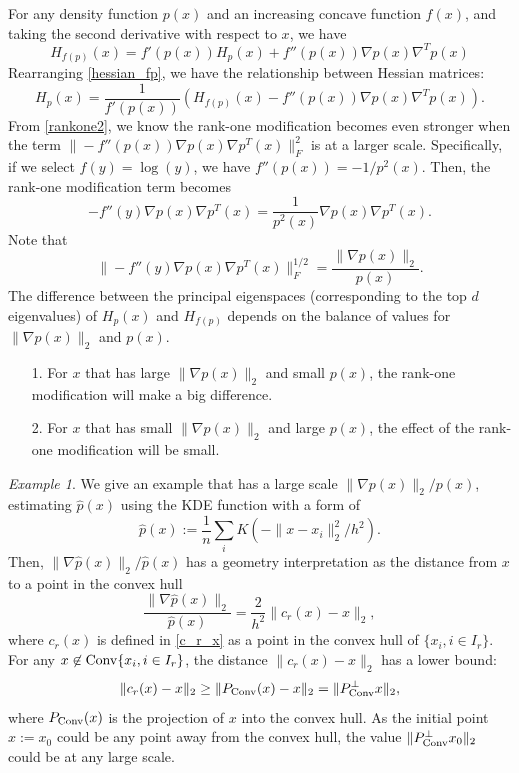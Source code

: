 \documentclass[aos,preprint]{imsart}
\theoremstyle{remark}
\newtheorem*{example}{Example}
\begin{document}
For any density function $p(x)$ and an increasing concave function $f(x)$, and taking the second derivative with respect to $x$, we have
\begin{equation}\label{hessian_fp}
H_{f(p)}(x) = f'(p(x)) H_p(x) +f''(p(x)) \nabla p(x)\nabla^T p(x)
\end{equation}
Rearranging \eqref{hessian_fp}, we have the relationship between Hessian matrices:
\begin{equation}\label{rankone2}
 H_{p}(x) =\frac{1}{ f'(p(x))} (H_{f(p)}(x) - f''(p(x))\nabla p(x) \nabla^T p(x)) .
\end{equation}
From \eqref{rankone2}, we know the rank-one modification becomes even stronger when the term $\|-f''(p(x))\nabla p(x) \nabla p^T(x)\|_F^2$ is at a larger scale. Specifically, if we select $f(y) = \log(y)$, we have $f''(p(x))=-1/p^2(x)$. Then, the rank-one modification term becomes
\[
-f''(y)\nabla p(x) \nabla p^T(x) = \frac{1}{p^2(x)} \nabla p(x) \nabla p^T(x).
\]
Note that
\[
\|-f''(y)\nabla p(x) \nabla p^T(x)\|_F^{1/2} = \frac{\|\nabla p(x)\|_2}{p(x)}.
\]
The difference between the principal eigenspaces (corresponding to the top $d$ eigenvalues) of $H_p(x)$ and $H_{f(p)}$ depends on the balance of values for $\|\nabla p(x)\|_2$ and $p(x)$.
\begin{itemize}
\item[1.] For $x$ that has large $\|\nabla p(x)\|_2$ and small $p(x)$, the rank-one modification will make a big difference.
\item[2.] For $x$ that has small $\|\nabla p(x)\|_2$ and large $p(x)$, the effect of the rank-one modification will be small.
\end{itemize}
\begin{example}
We give an example that has a large scale $\|\nabla p(x)\|_2/p(x)$, estimating $\hat{p}(x)$ using the KDE function with a form of 
\[
\hat{p}(x):=  \frac{1}{n} \sum_i K(-\|x-x_i\|_2^2/h^2).
\]
Then, $\|\nabla \hat{p}(x)\|_2/\hat{p}(x)$ has a geometry interpretation as the distance from $x$ to a point in the convex hull
\[
\frac{\|\nabla \hat{p}(x)\|_2}{\hat{p}(x)} = \frac{2}{h^2} \|c_r(x)-x\|_2,
\]
where $c_r(x)$ is defined in \eqref{c_r_x} as a point
in the convex hull of $\{x_i, i\in I_r\}$. For any $x\not \in {\rm Conv}\{x_i, i\in I_r \}$, the distance $\|c_r(x) -x\|_2$ has a lower bound:
\[
\|c_r(x) -x\|_2 \geq \|{ P}_{\rm Conv} (x) -x\|_2 = \|{ P}^{\perp}_{\rm Conv} x\|_2,
\]
where ${P}_{\rm Conv}(x)$ is the projection of $x$ into the convex hull. %
As the initial point $x:=x_0$ could be any point away from the convex hull, the value $\|{ P}^{\perp}_{\rm Conv} x_0\|_2$ could be at any large scale.
\end{example}
\end{document}
